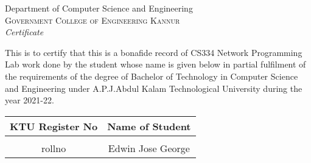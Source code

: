 \newpage
\thispagestyle{empty}
\vspace*{\fill}
\begin{onehalfspace}
\begin{center}

	\huge{Department of Computer Science and Engineering}\\[0.5cm]
	\normalsize \textsc{Government College of Engineering Kannur}\\[2.0cm]

	\emph{\LARGE Certificate}\\[1.0cm]
\end{center}

\normalsize This is to certify that this is a bonafide record of CS334 Network Programming Lab work done by the student whose name is given below in partial fulfilment of the requirements of the degree of Bachelor of Technology in Computer Science and Engineering under A.P.J.Abdul Kalam Technological University during the year 2021-22.\\[1.0cm]

\begin{table}[h]
	\centering
	\begin{tabular}{cc}
		KTU Register No & Name of Student
		\\ \hline \\
		rollno      & Edwin Jose George
	\end{tabular}
\end{table}


\begin{table}[h]
	\centering
\end{table}
\end{onehalfspace}
\vspace*{\fill}
